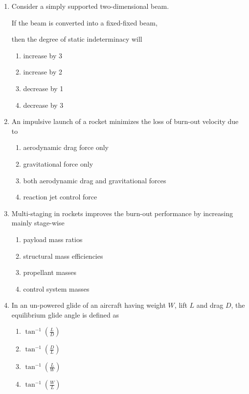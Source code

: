 \documentclass{article}
\begin{document}
\begin{enumerate}
\item Consider a simply supported two-dimensional beam.
\begin{figure}[H]
    \centering
    
    \caption{}
    \label{fig:q11(1)}
\end{figure}
If the beam is converted into a fixed-fixed beam,
\begin{figure}[H]
        \centering
        
        \caption{}
        \label{fig:q11(2)}
    \end{figure}
then the degree of static indeterminacy will
\begin{multicols}{4}
\begin{enumerate}
\item increase by 3
\item increase by 2
\item decrease by 1
\item decrease by 3
\end{enumerate}
\end{multicols}

\item An impulsive launch of a rocket minimizes the loss of burn-out velocity due to
\begin{enumerate}
\item aerodynamic drag force only
\item gravitational force only
\item both aerodynamic drag and gravitational forces
\item reaction jet control force
\end{enumerate}

\item Multi-staging in rockets improves the burn-out performance by increasing mainly stage-wise
\begin{multicols}{2}
\begin{enumerate}
\item payload mass ratios
\item structural mass efficiencies
\item propellant masses
\item control system masses
\end{enumerate}
\end{multicols}

\item In an un-powered glide of an aircraft having weight $W$, lift $L$ and drag $D$, the equilibrium glide angle is defined as
\begin{multicols}{4}
\begin{enumerate}
\item $\tan^{-1}(\frac{L}{D})$
\item $\tan^{-1}(\frac{D}{L})$
\item $\tan^{-1}(\frac{L}{W})$
\item $\tan^{-1}(\frac{W}{L})$
\end{enumerate}
\end{multicols}


\end{enumerate}
\end{document}
